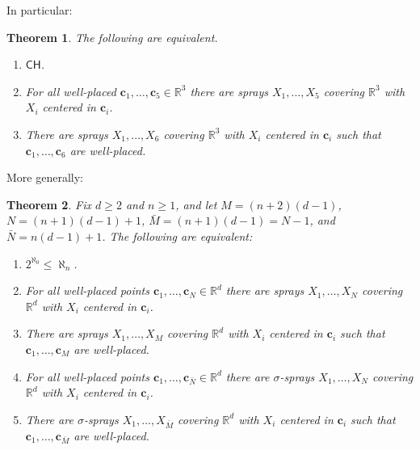 \documentclass[12pt]{amsart}
\newcommand{\CH}{{\mathsf{CH}}}	%
\newcommand{\R}{\mathbb{R}}	%
\theoremstyle{plain}
\newtheorem{theorem}{Theorem}[section]
\theoremstyle{definition}
\theoremstyle{remark}
\begin{document}
In particular:

\begin{theorem}\label{th:spraysinR3}
The following are equivalent.
\begin{enumerate}[label={\upshape (\alph*)}]
\item\label{th:spraysinR3-a}
\( \CH \).
\item\label{th:spraysinR3-b}
For all well-placed \( \mathbf{c}_1 , \dots , \mathbf{c}_5 \in \R^3 \) there are sprays \( X_1 , \dots , X_5 \) covering \( \R^3 \) with \( X_i \) centered in \( \mathbf{c}_i \).
\item\label{th:spraysinR3-c}
There are sprays \( X_1 , \dots , X_6 \) covering \( \R^3 \) with \( X_i \) centered in \( \mathbf{c}_i \) such that \( \mathbf{c}_1 , \dots , \mathbf{c}_6 \) are well-placed.
\end{enumerate}
\end{theorem}

More generally:

\begin{theorem}\label{th:spraysinRd-2}
Fix \( d \geq 2 \) and \( n \geq 1 \), and let \( M = ( n + 2 ) ( d - 1 ) \), \( N = ( n + 1 ) ( d - 1) + 1 \), \( \bar{M} = (n + 1 ) ( d - 1 ) = N - 1 \), and \( \bar{N} = n ( d - 1) + 1 \).
The following are equivalent:
\begin{enumerate}[label={\upshape (\alph*)}]
\item\label{th:spraysinRd-2-a}
\( 2^{\aleph_0 } \leq \aleph_n \).
\item\label{th:spraysinRd-2-b}
For all well-placed points \( \mathbf{c}_1 , \dots , \mathbf{c}_N \in \R^d \) there are sprays \( X_1, \dots , X_N \) covering \( \R^d \) with \( X_i \) centered in \( \mathbf{c}_i \).
\item\label{th:spraysinRd-2-c}
There are sprays \( X_1 , \dots , X_M \) covering \( \R^d \) with \( X_i \) centered in \( \mathbf{c}_i \) such that \( \mathbf{c}_1 , \dots , \mathbf{c}_M \) are well-placed.
\item\label{th:spraysinRd-2-d}
For all well-placed points \( \mathbf{c}_1 , \dots , \mathbf{c}_{\bar{N}} \in \R^d \) there are \( \sigma \)-sprays \( X_1, \dots , X_N \) covering \( \R^d \) with \( X_i \) centered in \( \mathbf{c}_i \).
\item\label{th:spraysinRd-2-e}
There are \( \sigma \)-sprays \( X_1 , \dots , X_{\bar{M}} \) covering \( \R^d \) with \( X_i \) centered in \( \mathbf{c}_i \) such that \( \mathbf{c}_1 , \dots , \mathbf{c}_{\bar{M}} \) are well-placed.
\end{enumerate}
\end{theorem}
\end{document}
